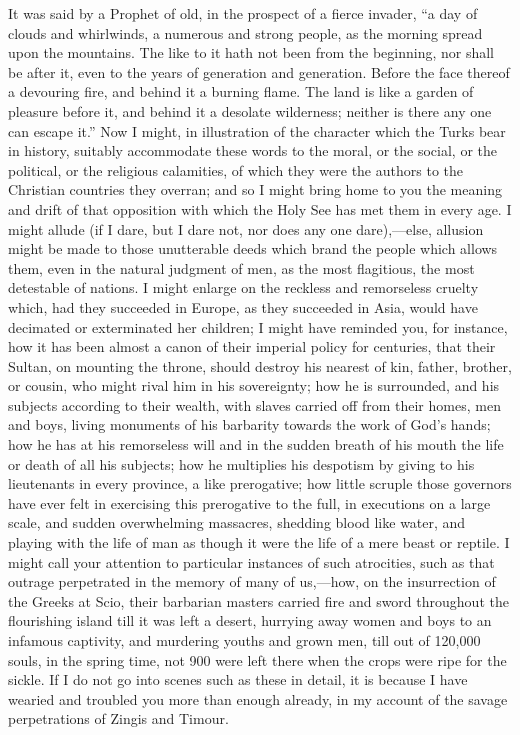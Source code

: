 It was said by a Prophet of
old, in the prospect of a fierce invader, ``a day of clouds and
whirlwinds, a numerous and strong people, as the morning spread upon
the mountains. The like to it hath not been from the beginning, nor
shall be after it, even to the years of generation and generation.
Before the face thereof a devouring fire, and behind it a burning
flame. The land is like a garden of pleasure before it, and behind it
a desolate wilderness; neither is there any one can escape it.'' Now I
might, in illustration of the character which the Turks bear in
history, suitably accommodate these words to the moral, or the social,
or the political, or the religious calamities, of which they were the
authors to the Christian countries they overran; and so I might bring
home to you the meaning and drift of that opposition with which the
Holy See has met them in every age. I might allude (if I dare, but I
dare not, nor does any one dare),—else, allusion might be made to
those unutterable deeds which brand the people which allows them, even
in the natural judgment of men, as the most flagitious, the most
detestable of nations. I might enlarge on the reckless and remorseless
cruelty which, had they succeeded in Europe, as they succeeded in
Asia, would have decimated or exterminated her children; I might have
reminded you, for instance, how it has been almost a canon of their
imperial policy for centuries, that their Sultan, on mounting the
throne, should destroy his nearest of kin, father, brother, or cousin,
who might rival him in his sovereignty; how he is surrounded, and his
subjects according to their wealth, with slaves carried off from
their homes, men and boys, living monuments of his barbarity towards
the work of God's hands; how he has at his remorseless will and in the
sudden breath of his mouth the life or death of all his subjects; how
he multiplies his despotism by giving to his lieutenants in every
province, a like prerogative; how little scruple those governors have
ever felt in exercising this prerogative to the full, in executions on
a large scale, and sudden overwhelming massacres, shedding blood like
water, and playing with the life of man as though it were the life of
a mere beast or reptile. I might call your attention to particular
instances of such atrocities, such as that outrage perpetrated in the
memory of many of us,—how, on the insurrection of the Greeks at
Scio, their barbarian masters carried fire and sword throughout the
flourishing island till it was left a desert, hurrying away women and
boys to an infamous captivity, and murdering youths and grown men,
till out of 120,000 souls, in the spring time, not 900 were left there
when the crops were ripe for the sickle. If I do not go into scenes
such as these in detail, it is because I have wearied and troubled you
more than enough already, in my account of the savage perpetrations of
Zingis and Timour.

